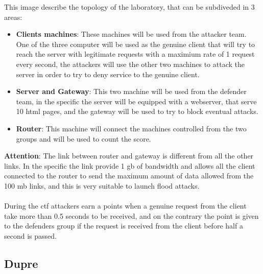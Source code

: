 \documentclass[14pt]{article}
\begin{document}
This image describe the topology of the laboratory, that can be subdiveded in 3 areas:
\begin{itemize}
	\item \textbf{Clients machines}: These machines will be used from the attacker team. One of the three computer will be used as the genuine client that will try to reach the server with legitimate requests with a maximium rate of 1 request every second, the attackers will use the other two machines to attack the server in order to try to deny service to the genuine client.
	
	\item \textbf{Server and Gateway}: This two machine will be used from the defender team, in the specific the server will be equipped with a webserver, that serve 10 html pages, and the gateway will be used to try to block eventual attacks.
	
	\item \textbf{Router}: This machine will connect the machines controlled from the two groups and will be used to count the score.
\end{itemize}

\textbf{Attention}: The link between router and gateway is different from all the other links. In the specific the link provide 1 gb of bandwidth and allows all the client connected to the router to send the maximum amount of data allowed from the 100 mb links, and this is very suitable to launch flood attacks.
\\
\\
During the ctf attackers earn a points when a genuine request from the client take more than 0.5 seconds to be received, and on the contrary the point is given to the defenders group if the request is received from the client before half a second is passed. 

\subsection{Dupre}
\end{document}
